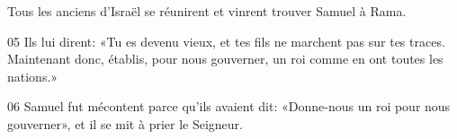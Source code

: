 Tous les anciens d’Israël se réunirent et vinrent trouver Samuel à Rama.

05 Ils lui dirent: «Tu es devenu vieux, et tes fils ne marchent pas sur tes traces. Maintenant donc, établis, pour nous gouverner, un roi comme en ont toutes les nations.»

06 Samuel fut mécontent parce qu’ils avaient dit: «Donne-nous un roi pour nous gouverner», et il se mit à prier le Seigneur.
